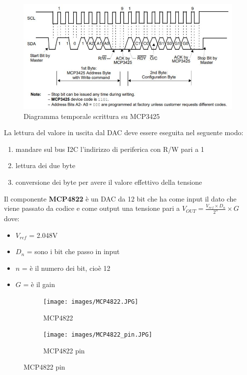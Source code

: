 \documentclass[12pt, a4paper, titlepage, oneside]{book}
\begin{document}
\begin{flushleft}
\newpage
\begin{figure}[h]
    \centering
    \includegraphics[scale = 1]{wrtie_configuration_MCP3425.JPG}
    \caption{Diagramma temporale scrittura su MCP3425}
    \label{fig:MCP3425_wrtie_conf}
\end{figure}
La lettura del valore in uscita dal DAC deve essere eseguita nel seguente modo:
\begin{enumerate}
    \item mandare sul bus I2C l'indirizzo di periferica con R/W pari a 1
    \item lettura dei due byte
    \item conversione dei byte per avere il valore effettivo della tensione
\end{enumerate}
\newpage

Il componente \textbf{MCP4822} è un DAC da 12 bit che ha come input il dato che viene passato da codice e come output una tensione pari a $V_{OUT} = \frac{V_{ref} \times D_n}{2^n} \times G$ dove:
\begin{itemize}
    \item $V_{ref}$ = 2.048V
    \item $D_n$ = sono i bit che passo in input
    \item $n$ = è il numero dei bit, cioè 12
    \item $G$ = è il gain
\end{itemize}

\begin{figure}[h]
\begin{subfigure}{0.5\textwidth}
\texttt{[image: images/MCP4822.JPG]} 
\caption{MCP4822}
\label{fig:MCP4822}
\end{subfigure}
\begin{subfigure}{0.5\textwidth}
\texttt{[image: images/MCP4822\_pin.JPG]}
\caption{MCP4822 pin}
\label{fig:MCP4822 pin}
\end{subfigure}
\end{figure}


\end{flushleft}
\end{document}
